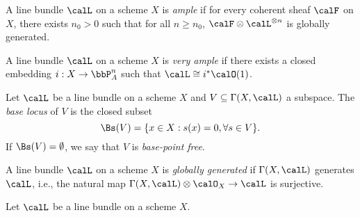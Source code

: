     \begin{definition}\label{def:ample_line_bundle}
        A line bundle \(\calL\) on a scheme \(X\) is \emph{ample} if for every coherent sheaf \(\calF\) on \(X\), there exists \(n_0>0\) such that for all \(n\ge n_0\), \(\calF\otimes \calL^{\otimes n}\) is globally generated.
    \end{definition}

    \begin{definition}\label{def:very_ample_line_bundle}
        A line bundle \(\calL\) on a scheme \(X\) is \emph{very ample} if there exists a closed embedding \(i:X\to \bbP^n_A\) such that \(\calL\cong i^*\calO(1)\).
    \end{definition}

    \begin{definition}\label{def:base_locus}
        Let \(\calL\) be a line bundle on a scheme \(X\) and \(V\subseteq \Gamma(X,\calL)\) a subspace.
        The \emph{base locus} of \(V\) is the closed subset
        \[
            \Bs(V) = \{x\in X : s(x)=0, \forall s\in V\}.
        \]
        If \(\Bs(V)=\emptyset\), we say that \(V\) is \emph{base-point free}.
    \end{definition}

    \begin{definition}\label{def:globally_generated_line_bundle}
        A line bundle \(\calL\) on a scheme \(X\) is \emph{globally generated} if \(\Gamma(X,\calL)\) generates \(\calL\), i.e., the natural map \(\Gamma(X,\calL)\otimes \calO_X \to \calL\) is surjective.
    \end{definition}

    \begin{definition}\label{def:base_locus_and_base_idea}
        Let \(\calL\) be a line bundle on a scheme \(X\).
    \end{definition}


